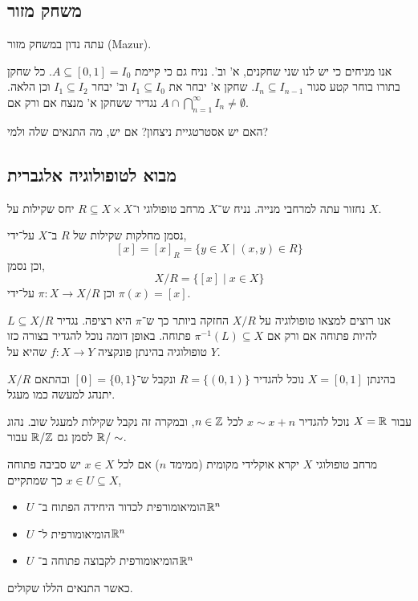 \subsection{משחק מזור}
עתה נדון במשחק מזור (Mazur).
\begin{definition}
	אנו מניחים כי יש לנו שני שחקנים, א' וב'.
	נניח גם כי קיימת $A \subseteq [0, 1] = I_0$.
	כל שחקן בתורו בוחר קטע סגור $I_n \subseteq I_{n - 1}$.
	שחקן א' יבחר את $I_1 \subseteq I_0$ וב' יבחר $I_1 \subseteq I_2$ וכן הלאה.
	נגדיר ששחקן א' מנצח אם ורק אם $A \cap \bigcap_{n = 1}^\infty I_n \ne \emptyset$.
\end{definition}
\begin{exercise}
	האם יש אסטרטגיית ניצחון?
	אם יש, מה התנאים שלה ולמי?
\end{exercise}

\subsection{מבוא לטופולוגיה אלגברית}
נחזור עתה למרחבי מנייה.
נניח ש־$X$ מרחב טופולוגי ו־$R \subseteq X \times X$ יחס שקילות על $X$.
\begin{notation}
	נסמן מחלקות שקילות של $R$ ב־$X$ על־ידי,
	\[
		[x] = {[x]}_R = \{ y \in X \mid (x, y) \in R \}
	\]
	וכן נסמן,
	\[
		X / R
		= \{ [x] \mid x \in X \}
	\]
	וכן $\pi : X \to X / R$ על־ידי $\pi(x) = [x]$.
\end{notation}
אנו רוצים למצאו טופולוגיה על $X / R$ החזקה ביותר כך ש־$\pi$ היא רציפה.
נגדיר $L \subseteq X / R$ להיות פתוחה אם ורק אם $\pi^{-1}(L) \subseteq X$ פתוחה.
באופן דומה נוכל להגדיר בצורה כזו טופולוגיה בהינתן פונקציה $f : X \to Y$ שהיא על $Y$.
\begin{example}
	בהינתן $X = [0, 1]$ נוכל להגדיר $R = \{ (0, 1) \}$ ונקבל ש־$[0] = \{0, 1\}$ ובהתאם $X / R$ יתנהג למעשה כמו מעגל.
\end{example}
\begin{example}
	עבור $X = \mathbb{R}$ נוכל להגדיר $x \sim x + n$ לכל $n \in \mathbb{Z}$, ובמקרה זה נקבל שקילות למעגל שוב.
	נהוג לסמן גם $\mathbb{R} / \mathbb{Z}$ עבור $\mathbb{R} / \sim$.
\end{example}
\begin{definition}
	מרחב טופולוגי $X$ יקרא אוקלידי מקומית (ממימד $n$) אם לכל $x \in X$ יש סביבה פתוחה $x \in U \subseteq X$ כך שמתקיים,
	\begin{itemize}
		\item $U$ הומיאומורפית לכדור היחידה הפתוח ב־$\mathbb{R}^n$
		\item $U$ הומיאומורפית ל־$\mathbb{R}^n$
		\item $U$ הומיאומורפית לקבוצה פתוחה ב־$\mathbb{R}^n$
	\end{itemize}
	כאשר התנאים הללו שקולים.
\end{definition}
